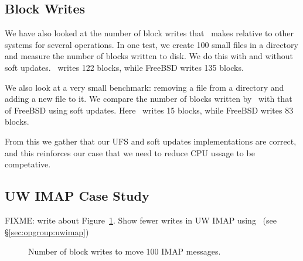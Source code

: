 \subsection {Block Writes}
We have also looked at the number of block writes that \Kudos\ makes
relative to other systems for several operations. In one test, we
create 100 small files in a directory and measure the number of blocks
written to disk. We do this with and without soft updates. \Kudos\
writes 122 blocks, while FreeBSD writes 135 blocks.

We also look at a very small benchmark: removing a file from a
directory and adding a new file to it. We compare the number of blocks
written by \Kudos\ with that of FreeBSD using soft updates. Here
\Kudos\ writes 15 blocks, while FreeBSD writes 83 blocks.

From this we gather that our UFS and soft updates implementations are
correct, and this reinforces our case that we need to reduce CPU
ussage to be competative.

\subsection {UW IMAP Case Study}
\label{sec:evaluation:uwimap}

FIXME: write about Figure~\ref{fig:imap-compare}.
Show fewer writes in UW IMAP using \opgroups\ (see \S\ref{sec:opgroup:uwimap})

\begin{figure}[htb]
\caption{\label{fig:imap-compare} Number of block writes to move 100
  IMAP messages.}
\end{figure}

